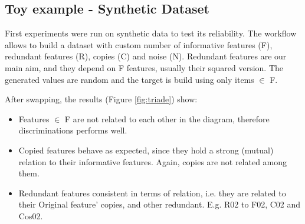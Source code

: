 \subsection{Toy example - Synthetic Dataset}
First experiments were run on synthetic data to test its reliability. The workflow allows to build a dataset with custom number of informative features (F), redundant features (R), copies (C) and noise (N). Redundant features are our main aim, and they depend on F features, usually their squared version. The generated values are random and the target is build using only items $\in$ F.

After swapping, the results (Figure \ref{fig:triade}) show:

\begin{itemize}
    \item Features $\in$ F are not related to each other in the diagram, therefore discriminations performs well.
    \item Copied features behave as expected, since they hold a strong (mutual) relation to their informative features. Again, copies are not related among them.
    \item Redundant features consistent in terms of relation, i.e. they are related to their Original feature’ copies, and other redundant. E.g. R02 to F02, C02 and Cos02.
\end{itemize}

